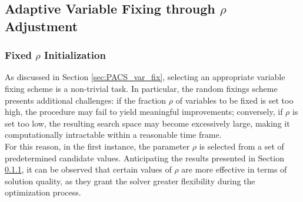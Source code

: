 \subsection{Adaptive Variable Fixing through $\rho$ Adjustment}
\subsubsection{Fixed $\rho$ Initialization}
As discussed in Section \ref{sec:PACS_var_fix}, selecting an appropriate variable fixing scheme is a non-trivial task. In particular, the random fixings scheme presents additional challenges: if the fraction $\rho$ of variables to be fixed is set too high, the procedure may fail to yield meaningful improvements; conversely, if $\rho$ is set too low, the resulting search space may become excessively large, making it computationally intractable within a reasonable time frame. \\
For this reason, in the first instance, the parameter $\rho$ is selected from a set of predetermined candidate values. Anticipating the results presented in Section \ref{}, it can be observed that certain values of $\rho$ are more effective in terms of solution quality, as they grant the solver greater flexibility during the optimization process.
